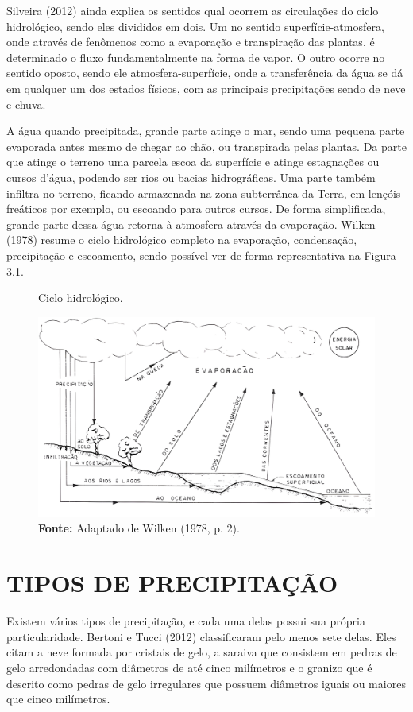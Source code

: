 Silveira (2012) ainda explica os sentidos qual ocorrem as circulações do ciclo hidrológico, sendo eles divididos em dois. Um no sentido superfície-atmosfera, onde através de fenômenos como a evaporação e transpiração das plantas, é determinado o fluxo fundamentalmente na forma de vapor. O outro ocorre no sentido oposto, sendo ele atmosfera-superfície, onde a transferência da água se dá em qualquer um dos estados físicos, com as principais precipitações sendo de neve e chuva.

\newpage

A água quando precipitada, grande parte atinge o mar, sendo uma pequena parte evaporada antes mesmo de chegar ao chão, ou transpirada pelas plantas. Da parte que atinge o terreno uma parcela escoa da superfície e atinge estagnações ou cursos d'água, podendo ser rios ou bacias hidrográficas. Uma parte também infiltra no terreno, ficando armazenada na zona subterrânea da Terra, em lençóis freáticos por exemplo, ou escoando para outros cursos. De forma simplificada, grande parte dessa água retorna à atmosfera através da evaporação. Wilken (1978) resume o ciclo hidrológico completo na evaporação, condensação, precipitação e escoamento, sendo possível ver de forma representativa na Figura 3.1.\bigskip

\begin{figure}[!ht]
	\centering
	\caption{Ciclo hidrológico.}
	\includegraphics[width=.7625\linewidth]{figuras/ciclo_hidrologico.png}
	\caption*{\textbf{Fonte:} Adaptado de Wilken (1978, p. 2).}
	\label{fig:ciclo_hidrologico.png}
\end{figure}

\section{TIPOS DE PRECIPITAÇÃO}

Existem vários tipos de precipitação, e cada uma delas possui sua própria particularidade. Bertoni e Tucci (2012) classificaram pelo menos sete delas. Eles citam a neve formada por cristais de gelo, a saraiva que consistem em pedras de gelo arredondadas com diâmetros de até cinco milímetros e o granizo que é descrito como pedras de gelo irregulares que possuem diâmetros iguais ou maiores que cinco milímetros.


